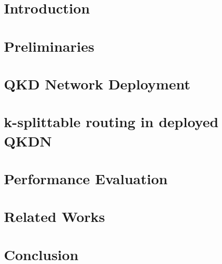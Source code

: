 \documentclass[10pt,conference,compsocconf,letterpaper]{IEEEtran}
\begin{document}
\section{Introduction}\label{sec:intro}



%


\section{Preliminaries}\label{sec:prelim}



\section{QKD Network Deployment}\label{sec:deployment}



\section{k-splittable routing in deployed QKDN}\label{sec:dynamicupdate}



\section{Performance Evaluation}\label{sec:evaluation}



\section{Related Works}\label{sec:relwork}



\section{Conclusion}\label{sec:conclusion}



\end{document}
